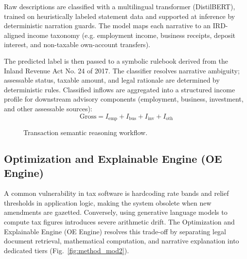 \documentclass[conference]{IEEEtran}
\begin{document}
Raw descriptions are classified with a multilingual transformer (DistilBERT), trained on heuristically labeled statement data and supported at inference by deterministic narration guards. The model maps each narrative to an IRD-aligned income taxonomy (e.g. employment income, business receipts, deposit interest, and non-taxable own-account transfers).

The predicted label is then passed to a symbolic rulebook derived from the Inland Revenue Act No. 24 of 2017. The classifier resolves narrative ambiguity; assessable status, taxable amount, and legal rationale are determined by deterministic rules. Classified inflows are aggregated into a structured income profile for downstream advisory components (employment, business, investment, and other assessable sources):
\begin{equation}
\text{Gross} = I_{\text{emp}} + I_{\text{bus}} + I_{\text{inv}} + I_{\text{oth}}
\end{equation}

\begin{figure}[!htbp]
\centering
{}
\caption{Transaction semantic reasoning workflow.}
\label{fig:txn_workflow}
\end{figure}

\subsection{Optimization and Explainable Engine (OE Engine)}
A common vulnerability in tax software is hardcoding rate bands and relief thresholds in application logic, making the system obsolete when new amendments are gazetted. Conversely, using generative language models to compute tax figures introduces severe arithmetic drift. The Optimization and Explainable Engine (OE Engine) resolves this trade-off by separating legal document retrieval, mathematical computation, and narrative explanation into dedicated tiers (Fig.~\ref{fig:method_mod2}).
\end{document}
